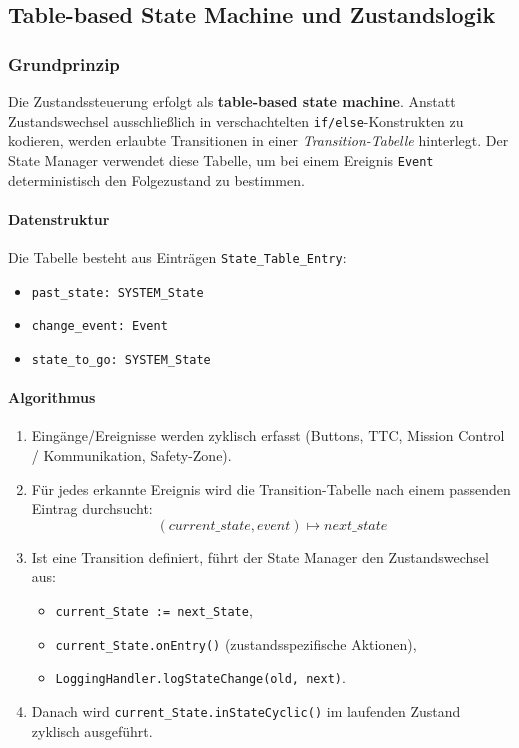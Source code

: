 \subsection{Table-based State Machine und Zustandslogik}
\subsubsection{Grundprinzip}
Die Zustandssteuerung erfolgt als \textbf{table-based state machine}. Anstatt Zustandswechsel ausschließlich in
verschachtelten \texttt{if/else}-Konstrukten zu kodieren, werden erlaubte Transitionen in einer \emph{Transition-Tabelle} hinterlegt.
Der State Manager verwendet diese Tabelle, um bei einem Ereignis \texttt{Event} deterministisch den Folgezustand zu bestimmen.

\paragraph{Datenstruktur}
Die Tabelle besteht aus Einträgen \texttt{State\_Table\_Entry}:
\begin{itemize}[leftmargin=*, itemsep=2pt]
  \item \texttt{past\_state: SYSTEM\_State}
  \item \texttt{change\_event: Event}
  \item \texttt{state\_to\_go: SYSTEM\_State}
\end{itemize}

\paragraph{Algorithmus}
\begin{enumerate}[leftmargin=*, itemsep=2pt]
  \item Eingänge/Ereignisse werden zyklisch erfasst (Buttons, TTC, Mission Control / Kommunikation, Safety-Zone).
  \item Für jedes erkannte Ereignis wird die Transition-Tabelle nach einem passenden Eintrag durchsucht:
    \[
      (current\_state, event) \mapsto next\_state
    \]
  \item Ist eine Transition definiert, führt der State Manager den Zustandswechsel aus:
    \begin{itemize}[leftmargin=*, itemsep=2pt]
      \item \texttt{current\_State := next\_State},
      \item \texttt{current\_State.onEntry()} (zustandsspezifische Aktionen),
      \item \texttt{LoggingHandler.logStateChange(old, next)}.
    \end{itemize}
  \item Danach wird \texttt{current\_State.inStateCyclic()} im laufenden Zustand zyklisch ausgeführt.
\end{enumerate}

